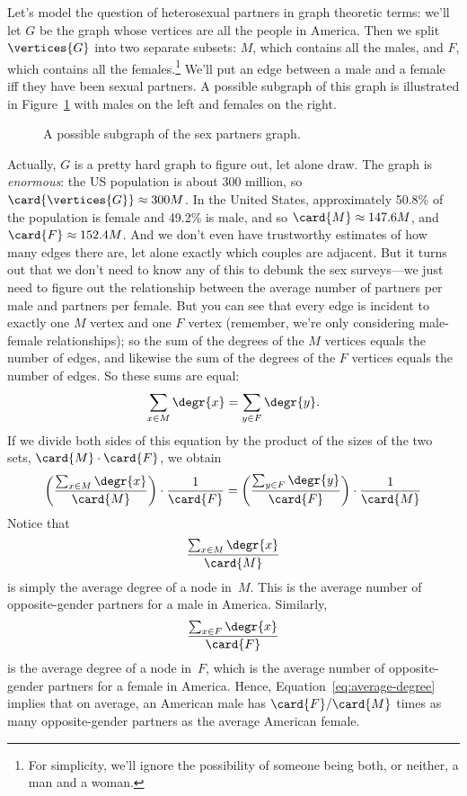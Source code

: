 Let's model the question of heterosexual partners in graph theoretic
terms: we'll let $G$ be the graph whose vertices
are all the people in America.  Then we split $\vertices{G}$ into two separate
subsets: $M$, which contains all the males, and $F$, which contains
all the females.\footnote{For simplicity, we'll ignore the possibility
  of someone being both, or neither, a man and a woman.}  We'll put an
edge between a male and a female iff they have been sexual partners.
A possible subgraph of this graph is illustrated in
Figure~\ref{fig:partners} with males on the left and females on the
right.

\begin{figure}[htbp]


\caption{A possible subgraph of the sex partners graph.}
\label{fig:partners}
\end{figure}

Actually, $G$ is a pretty hard graph to figure out, let alone draw.  The
graph is \emph{enormous}: the US population is about 300 million, so
$\card{\vertices{G}} \approx 300M$.  In the United States, approximately
50.8\% of the population is female and 49.2\% is male, and so $\card{M}
\approx 147.6M$, and $\card{F} \approx 152.4M$.  And we don't even have
trustworthy estimates of how many edges there are, let alone exactly which
couples are adjacent.  But it turns out that we don't need to know any of
this to debunk the sex surveys---we just need to figure out the
relationship between the average number of partners per male and partners
per female.   But you can see that every edge is incident
to exactly one $M$ vertex and one $F$ vertex (remember, we're only
considering male-female relationships); so the sum of the degrees of the
$M$ vertices equals the number of edges, and  likewise
the sum of the degrees of the $F$ vertices equals the number of edges.  So
these sums are equal:
%
\[
\sum_{x \in M} \degr{x} = \sum_{y \in F} \degr{y}.
\]
%
If we divide both sides of this equation by the product of the sizes
of the two sets, $\card{M} \cdot \card{F}$, we obtain
%
\begin{equation}\label{eq:average-degree}
\left(\frac{\sum_{x \in M} \degr{x}}{\card{M}}\right) \cdot \frac{1}{\card{F}} =
\left(\frac{\sum_{y \in F} \degr{y}}{\card{F}}\right) \cdot \frac{1}{\card{M}}
\end{equation}
Notice that
\begin{equation*}
    \frac{\sum_{x \in M} \degr{x}}{\card{M}}
\end{equation*}
is simply the average degree of a node in~$M$.  This is the average
number of opposite-gender partners for a male in America.  Similarly,
\begin{equation*}
    \frac{\sum_{x \in F} \degr{x}}{\card{F}}
\end{equation*}
is the average degree of a node in~$F$, which is the average number of
opposite-gender partners for a female in America.  Hence,
Equation~\ref{eq:average-degree} implies that on average, an American
male has $\card{F}/\card{M}$ times as many opposite-gender partners as the
average American female.

